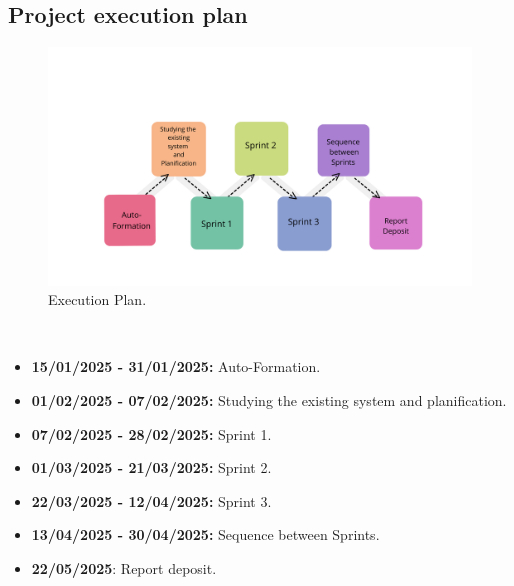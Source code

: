 \subsection{Project execution plan}
\begin{figure}[h]
    \centering
    \includegraphics[width=1\textwidth]{figures/sprintplan.png} 
    \caption{Execution Plan.}
\end{figure} \
\begin{itemize}
    \item \textbf{15/01/2025 - 31/01/2025:} Auto-Formation.
    \item \textbf{01/02/2025 - 07/02/2025:} Studying the existing system and planification.
    \item \textbf{07/02/2025 - 28/02/2025:} Sprint 1.
    \item \textbf{01/03/2025 - 21/03/2025:} Sprint 2.
    \item \textbf{22/03/2025 - 12/04/2025:} Sprint 3.
    \item \textbf{13/04/2025 - 30/04/2025:} Sequence between Sprints.
    \item \textbf{22/05/2025}: Report deposit.
\end{itemize}
\clearpage

